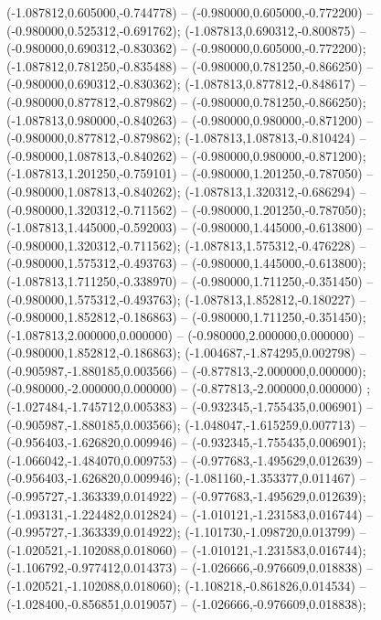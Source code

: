  (-1.087812,0.605000,-0.744778) -- (-0.980000,0.605000,-0.772200) -- (-0.980000,0.525312,-0.691762);
 (-1.087813,0.690312,-0.800875) -- (-0.980000,0.690312,-0.830362) -- (-0.980000,0.605000,-0.772200);
 (-1.087812,0.781250,-0.835488) -- (-0.980000,0.781250,-0.866250) -- (-0.980000,0.690312,-0.830362);
 (-1.087813,0.877812,-0.848617) -- (-0.980000,0.877812,-0.879862) -- (-0.980000,0.781250,-0.866250);
 (-1.087813,0.980000,-0.840263) -- (-0.980000,0.980000,-0.871200) -- (-0.980000,0.877812,-0.879862);
 (-1.087813,1.087813,-0.810424) -- (-0.980000,1.087813,-0.840262) -- (-0.980000,0.980000,-0.871200);
 (-1.087813,1.201250,-0.759101) -- (-0.980000,1.201250,-0.787050) -- (-0.980000,1.087813,-0.840262);
 (-1.087813,1.320312,-0.686294) -- (-0.980000,1.320312,-0.711562) -- (-0.980000,1.201250,-0.787050);
 (-1.087813,1.445000,-0.592003) -- (-0.980000,1.445000,-0.613800) -- (-0.980000,1.320312,-0.711562);
 (-1.087813,1.575312,-0.476228) -- (-0.980000,1.575312,-0.493763) -- (-0.980000,1.445000,-0.613800);
 (-1.087813,1.711250,-0.338970) -- (-0.980000,1.711250,-0.351450) -- (-0.980000,1.575312,-0.493763);
 (-1.087813,1.852812,-0.180227) -- (-0.980000,1.852812,-0.186863) -- (-0.980000,1.711250,-0.351450);
 (-1.087813,2.000000,0.000000) -- (-0.980000,2.000000,0.000000) -- (-0.980000,1.852812,-0.186863);
 (-1.004687,-1.874295,0.002798) -- (-0.905987,-1.880185,0.003566) -- (-0.877813,-2.000000,0.000000);
 (-0.980000,-2.000000,0.000000) -- (-0.877813,-2.000000,0.000000) ;
 (-1.027484,-1.745712,0.005383) -- (-0.932345,-1.755435,0.006901) -- (-0.905987,-1.880185,0.003566);
 (-1.048047,-1.615259,0.007713) -- (-0.956403,-1.626820,0.009946) -- (-0.932345,-1.755435,0.006901);
 (-1.066042,-1.484070,0.009753) -- (-0.977683,-1.495629,0.012639) -- (-0.956403,-1.626820,0.009946);
 (-1.081160,-1.353377,0.011467) -- (-0.995727,-1.363339,0.014922) -- (-0.977683,-1.495629,0.012639);
 (-1.093131,-1.224482,0.012824) -- (-1.010121,-1.231583,0.016744) -- (-0.995727,-1.363339,0.014922);
 (-1.101730,-1.098720,0.013799) -- (-1.020521,-1.102088,0.018060) -- (-1.010121,-1.231583,0.016744);
 (-1.106792,-0.977412,0.014373) -- (-1.026666,-0.976609,0.018838) -- (-1.020521,-1.102088,0.018060);
 (-1.108218,-0.861826,0.014534) -- (-1.028400,-0.856851,0.019057) -- (-1.026666,-0.976609,0.018838);
